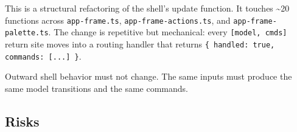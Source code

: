 This is a structural refactoring of the shell's update function. It touches \textasciitilde20 functions across \texttt{a\allowbreak{}p\allowbreak{}p\allowbreak{}-\allowbreak{}f\allowbreak{}r\allowbreak{}a\allowbreak{}m\allowbreak{}e\allowbreak{}.\allowbreak{}t\allowbreak{}s}, \texttt{a\allowbreak{}p\allowbreak{}p\allowbreak{}-\allowbreak{}f\allowbreak{}r\allowbreak{}a\allowbreak{}m\allowbreak{}e\allowbreak{}-\allowbreak{}a\allowbreak{}c\allowbreak{}t\allowbreak{}i\allowbreak{}o\allowbreak{}n\allowbreak{}s\allowbreak{}.\allowbreak{}t\allowbreak{}s}, and \texttt{a\allowbreak{}p\allowbreak{}p\allowbreak{}-\allowbreak{}f\allowbreak{}r\allowbreak{}a\allowbreak{}m\allowbreak{}e\allowbreak{}-\allowbreak{}p\allowbreak{}a\allowbreak{}l\allowbreak{}e\allowbreak{}t\allowbreak{}t\allowbreak{}e\allowbreak{}.\allowbreak{}t\allowbreak{}s}. The change is repetitive but mechanical: every \texttt{[\allowbreak{}m\allowbreak{}o\allowbreak{}d\allowbreak{}e\allowbreak{}l\allowbreak{},\allowbreak{} \allowbreak{}c\allowbreak{}m\allowbreak{}d\allowbreak{}s\allowbreak{}]} return site moves into a routing handler that returns \texttt{\{\allowbreak{} \allowbreak{}h\allowbreak{}a\allowbreak{}n\allowbreak{}d\allowbreak{}l\allowbreak{}e\allowbreak{}d\allowbreak{}:\allowbreak{} \allowbreak{}t\allowbreak{}r\allowbreak{}u\allowbreak{}e\allowbreak{},\allowbreak{} \allowbreak{}c\allowbreak{}o\allowbreak{}m\allowbreak{}m\allowbreak{}a\allowbreak{}n\allowbreak{}d\allowbreak{}s\allowbreak{}:\allowbreak{} \allowbreak{}[\allowbreak{}.\allowbreak{}.\allowbreak{}.\allowbreak{}]\allowbreak{} \allowbreak{}\}}.

Outward shell behavior must not change. The same inputs must produce the same model transitions and the same commands.

\subsection{Risks}\label{record-155-risks}

